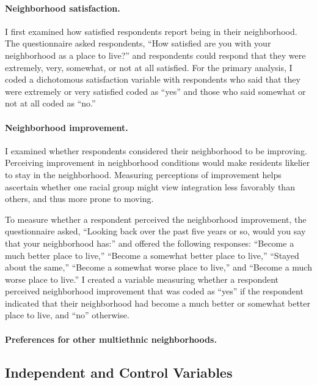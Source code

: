 \documentclass[11pt]{baderart}
\begin{document}
\paragraph{Neighborhood satisfaction.} I first examined how satisfied respondents report being in their neighborhood. The questionnaire asked respondents, ``How satisfied are you with your neighborhood as a place to live?'' and respondents could respond that they were extremely, very, somewhat, or not at all satisfied. For the primary analysis, I coded a dichotomous satisfaction variable with respondents who said that they were extremely or very satisfied coded as ``yes'' and those who said somewhat or not at all coded as ``no.'' 

\paragraph{Neighborhood improvement.} I examined whether respondents considered their neighborhood to be improving. Perceiving improvement in neighborhood conditions would make residents likelier to stay in the neighborhood. Measuring perceptions of improvement helps ascertain whether one racial group might view integration less favorably than others, and thus more prone to moving. 

To measure whether a respondent perceived the neighborhood improvement, the questionnaire asked, ``Looking back over the past five years or so, would you say that your neighborhood has:'' and offered the following responses: ``Become a much better place to live,'' ``Become a somewhat better place to live,'' ``Stayed about the same,'' ``Become a somewhat worse place to live,'' and ``Become a much worse place to live.'' I created a variable measuring whether a respondent perceived neighborhood improvement that was coded as ``yes'' if the respondent indicated that their neighborhood had become a much better or somewhat better place to live, and ``no'' otherwise. 

\paragraph{Preferences for other multiethnic neighborhoods.}





\subsection{Independent and Control Variables}
\end{document}
